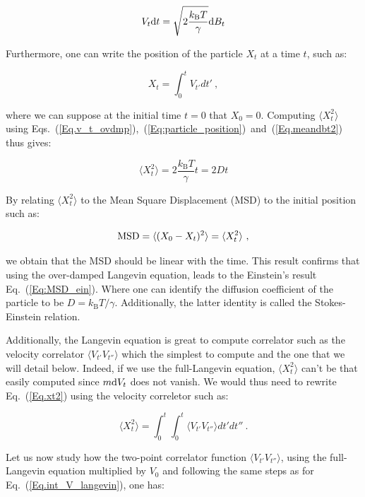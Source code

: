 \begin{equation}
	V_t\textnormal{d}t  = \sqrt{2\frac{k_\mathrm{B}T}{\gamma}} \textnormal{d}B_t 
	\label{Eq.v_t_ovdmp}
\end{equation}

Furthermore, one can write the position of the particle $X_t$ at a time $t$, such as:

\begin{equation}
	X_t = \int _0 ^t V_{t'}dt'~,
	\label{Eq:particle_position}
\end{equation}

where we can suppose at the initial time $t=0$ that $X_0 = 0$. Computing 
$\langle X_t^2 \rangle$ using Eqs.~(\ref{Eq.v_t_ovdmp}),~(\ref{Eq:particle_position})~and~(\ref{Eq.meandbt2}) thus gives:

\begin{equation}
	\langle X_t ^2 \rangle =  2\frac{k_\mathrm{B}T}{\gamma}t = 2Dt
	\label{Eq.xt2}
\end{equation}

By relating $\langle X_t ^2 \rangle$ to the Mean Square Displacement (\gls{MSD}) to the initial position such as:

\begin{equation}
	\textnormal{MSD} = \langle (X_0 - X_ t)^2 \rangle =  \langle X_t ^2 \rangle~,
\end{equation}


we obtain that the \gls{MSD} should be linear with the time. This result confirms that using the over-damped Langevin equation, leads to the Einstein's result Eq.~(\ref{Eq:MSD_ein}). Where one can identify the diffusion coefficient of the particle to be $D = k_\mathrm{B}T / \gamma$. Additionally, the latter identity is called the Stokes-Einstein  relation.


Additionally, the Langevin equation is great to compute correlator such as the velocity correlator $ \langle V_{t'}V_{t''} \rangle$ which the simplest to compute and the one that we will detail below. Indeed, if we use the full-Langevin equation, $\langle X_t ^2 \rangle$ can't be that easily computed since $m\textnormal{d} V_t$ does not vanish. We would thus need to rewrite Eq.~(\ref{Eq.xt2})  using the velocity correletor such as:

\begin{equation}
	\langle X_t ^ 2 \rangle  = \int _0 ^ {t} \int _0 ^{t} \langle V_{t'}V_{t''} \rangle dt'dt'' ~.
	\label{Eq.int_msd}
\end{equation}

Let us now study how the two-point correlator function $ \langle V_{t'}V_{t''} \rangle $, using the full-Langevin equation multiplied by $V_0$ and following the same steps as for Eq.~(\ref{Eq.int_V_langevin}), one  has:

